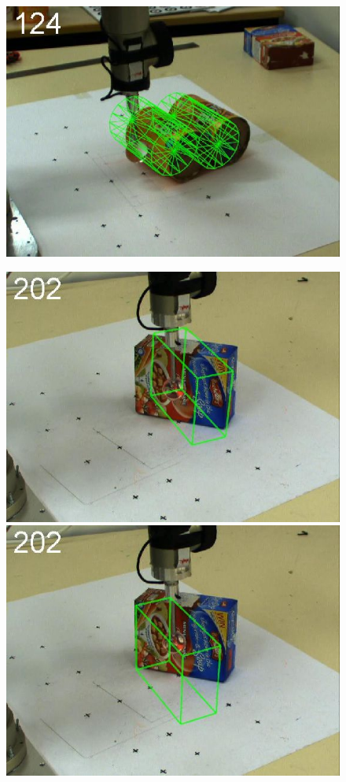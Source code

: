 \begin{figure}[tbp]
{\includegraphics[width=\imgCXwid]{images/C2_3exp_75_3}
}
\centerline{
\includegraphics[width=\imgCXwid]{images/C1_2exp_87_4}
\includegraphics[width=\imgCXwid]{images/C1_1exp_87_4}
}
\end{figure}
